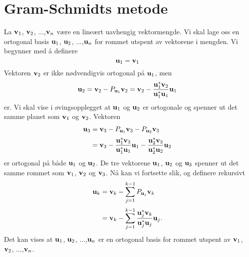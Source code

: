 \section*{Gram-Schmidts metode}
La $\mathbf{v}_1$, $\mathbf{v}_2$, ...,$\mathbf{v}_n$ være en lineært uavhengig vektormengde. 
Vi skal lage oss en ortogonal basis $\mathbf{u}_1$, $\mathbf{u}_2$, ...,$\mathbf{u}_n$ for rommet utspent av vektorene i mengden. 
Vi begynner med å definere
\[
\mathbf{u}_1=\mathbf{v}_1
\]
Vektoren $\mathbf{v}_2$ er ikke nødvendigvis ortogonal på $\mathbf{u}_1$, men 
\[
\mathbf{u}_2=\mathbf{v}_2-P_{\mathbf{u}_1} \mathbf{v}_2=\mathbf{v}_2-\frac{ \mathbf{u}_1^*\mathbf{v}_2}{\mathbf{u}_1^* \mathbf{u}_1}\mathbf{u}_1
\]
er. 
Vi skal vise i øvingsopplegget at   $\mathbf{u}_1$ og $\mathbf{u}_2$ er ortogonale og spenner ut det samme planet som $\mathbf{v}_1$ og $\mathbf{v}_2$.
Vektoren 
\begin{align*}
\mathbf{u}_3&=\mathbf{v}_3-P_{\mathbf{u}_1} \mathbf{v}_3-P_{\mathbf{u}_2} \mathbf{v}_3\\[2pt]&=\mathbf{v}_3-\frac{ \mathbf{u}_1^*\mathbf{v}_3}{\mathbf{u}_1^* \mathbf{u}_1}\mathbf{u}_1-\frac{ \mathbf{u}_2^*\mathbf{v}_3}{\mathbf{u}_2^* \mathbf{u}_2}\mathbf{u}_2
\end{align*}
er ortogonal på både $\mathbf{u}_1$ og $\mathbf{u}_2$. 
De tre vektorene $\mathbf{u}_1$, $\mathbf{u}_2$ og $\mathbf{u}_3$  
spenner ut det samme rommet som $\mathbf{v}_1$, $\mathbf{v}_2$ og $\mathbf{v}_3$. 
Nå kan vi fortsette slik, og definere rekursivt
\begin{align*}
\mathbf{u}_k&=\mathbf{v}_k-\sum_{j=1}^{k-1}P_{\mathbf{u}_j} \mathbf{v}_k\\[2pt]&=\mathbf{v}_k-\sum_{j=1}^{k-1}\frac{ \mathbf{u}_j^*\mathbf{v}_k}{\mathbf{u}_j^* \mathbf{u}_j}\mathbf{u}_j.
\end{align*}
Det kan vises at $\mathbf{u}_1$, $\mathbf{u}_2$, ...,$\mathbf{u}_n$ er en ortogonal basis for rommet utspent av $\mathbf{v}_1$, $\mathbf{v}_2$, ...,$\mathbf{v}_n$.





